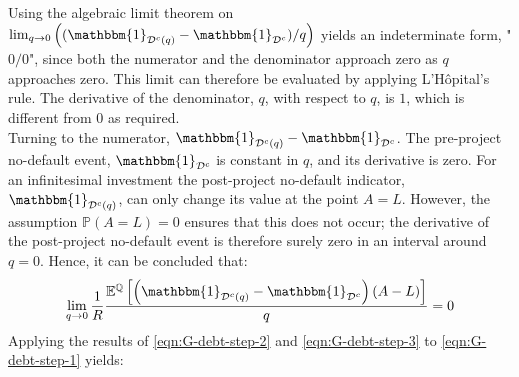 \documentclass[../main.tex]{subfiles}
\begin{document}
        Using the algebraic limit theorem on 
        $\lim_{q\rightarrow0}
        \left(
            (\mathbbm{1}_{\mathcal{D}^{c}(q)} 
            - \mathbbm{1}_{\mathcal{D}^{c}})
        / q
        \right) 
        $
        yields an indeterminate form, "$0/0$", since both the numerator and the denominator 
        approach zero as $q$ approaches zero.
        This limit can therefore be evaluated by applying 
        L'H\^{o}pital's  %
        rule.
        The derivative of the denominator, $q$, with respect to $q$, is $1$,
        which is different from $0$ as required. 
        \\
        Turning to the numerator, $\mathbbm{1}_{\mathcal{D}^{c}(q)} - \mathbbm{1}_{\mathcal{D}^{c}}$.
        The pre-project no-default event, $\mathbbm{1}_{\mathcal{D}^{c}}$ is constant in $q$, 
        and its derivative is zero. 
        For an infinitesimal investment the post-project no-default indicator, 
        $\mathbbm{1}_{\mathcal{D}^{c}(q)}$, can only change its value at the point $A = L$. 
        However, the assumption $\mathbb{P}\left(A = L\right) = 0$ ensures that this does not occur;
        the derivative of the post-project no-default event
        is therefore surely zero in an interval around $q=0$.
        Hence, it can be concluded that:
        \begin{equation}
            \lim_{q\rightarrow0} 
            \discountfactor
            \frac{
            \mathbb{E}^{\mathbb{Q}}\left[
                \left(
                    \mathbbm{1}_{\mathcal{D}^{c}(q)} 
                    - \mathbbm{1}_{\mathcal{D}^{c}}
                \right)
                \left(
                    A - L
                \right)
            \right] 
            }{
                q
            }
            = 0
            \label{eqn:G-debt-step-3}
        \end{equation}
        Applying the results of \cref{eqn:G-debt-step-2} and \cref{eqn:G-debt-step-3}
        to \cref{eqn:G-debt-step-1} yields:
\end{document}
